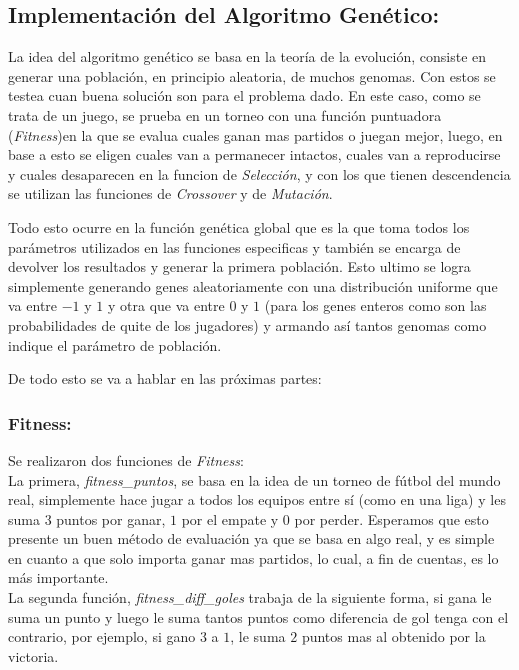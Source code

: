 \subsection{Implementación del Algoritmo Genético:}

La idea del algoritmo genético se basa en la teoría de la evolución, consiste en generar una población,
en principio aleatoria, de muchos genomas. Con estos se testea cuan buena solución son para el problema dado.
En este caso, como se trata de un juego, se prueba en un torneo con una función puntuadora
(\emph{Fitness})en la que se evalua cuales ganan mas partidos o juegan mejor, luego, en base a esto se eligen cuales van a
permanecer intactos, cuales van a reproducirse y cuales desaparecen en la funcion de \emph{Selección}, y con los que tienen
 descendencia se utilizan las funciones de \emph{Crossover} y de \emph{Mutación}.


Todo esto ocurre en la función genética global que es la que toma todos los parámetros utilizados en las funciones especificas
y también se encarga de devolver los resultados y generar la primera población.
Esto ultimo se logra simplemente generando genes aleatoriamente con una distribución uniforme que va entre $-1$ y $1$
y otra que va entre $0$ y $1$ (para los genes enteros como son las probabilidades de quite de los jugadores) y armando
así tantos genomas como indique el parámetro de población.

De todo esto se va a hablar en las próximas partes:\\

\subsubsection{Fitness:}

Se realizaron dos funciones de \emph{Fitness}:\\


La primera, \emph{fitness\_puntos}, se basa en la idea de un torneo de fútbol del mundo real, simplemente hace jugar a todos
los equipos entre sí (como en una liga) y les suma $3$ puntos por ganar, $1$ por el empate y $0$ por perder.
Esperamos que esto presente un buen método de evaluación ya que se basa en algo real, y es simple en cuanto a que solo importa ganar
mas partidos, lo cual, a fin de cuentas, es lo más importante.\\

La segunda función, \emph{fitness\_diff\_goles} trabaja de la siguiente forma, si gana le suma un punto y luego le suma tantos
puntos como diferencia de gol tenga con el contrario, por ejemplo, si gano $3$ a $1$, le suma $2$ puntos mas al obtenido por
la victoria.

